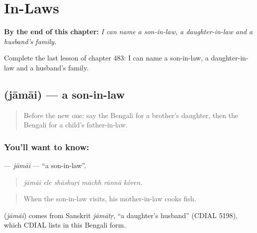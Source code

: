 
\chapter{In-Laws}
\label{ch:bn-in-laws}

\begin{chapteropening}
\textbf{By the end of this chapter:} \emph{I can name a son-in-law, a daughter-in-law and a husband's family.}

Complete the last lesson of chapter 483: I can name a son-in-law, a daughter-in-law and a husband's family.
\end{chapteropening}

\section[\texorpdfstring{\bn{জামাই} (jāmāi)}{জামাই (jāmāi)}]{ (jāmāi) — a son-in-law}

\label{lesson:BN-C483-jamai}



\begin{quote}
Before the new one: say the Bengali for a brother's daughter, then the Bengali for a child's father-in-law.
\end{quote}

\subsection*{You'll want to know: }
\textbf{} — \emph{jāmāi} — \textquotedblleft{}a son-in-law\textquotedblright{}.

\begin{quote}
     
\end{quote}

\begin{quote}
\emph{jāmāi ele shāshuṛi māchh rānnā kôren.}
\end{quote}

\begin{quote}
When the son-in-law visits, his mother-in-law cooks fish.
\end{quote}

\begin{cousinweb}
\textbf{} (\emph{jāmāi}) comes from Sanskrit \emph{jāmātṛ}, \textquotedblleft{}a daughter's husband\textquotedblright{} (CDIAL 5198), which CDIAL lists in this Bengali form.
\end{cousinweb}

